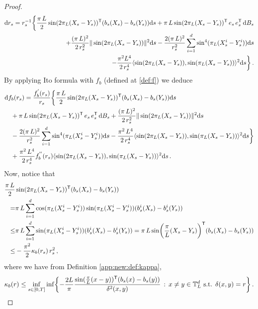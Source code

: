 \documentclass[final,12pt]{colt2023} %
\newcommand{\bes}{\begin{equation}}
\newcommand{\ees}{\end{equation}}
\newcommand{\De}{\mathrm{d}}
\begin{document}
\begin{proof}
\bes
\begin{split}
    \De r_s=r_s^{-1} \biggl\{\frac{{\pi \, L}}{2}\sin(2{\pi_L}(X_s-Y_s))^{{\sf  T}}(b_s(X_s)-b_s(Y_s))\De s+{\pi \, L}\sin(2{\pi_L}(X_s-Y_s))^{{\sf  T}}\,e_s\,e_s^{{\sf  T}}\,\De B_s\\
+\frac{(\pi \, L)^2}{2\,r_s^2}\|\sin(2{\pi_L}(X_s-Y_s))\|^2\De s- \frac{2(\pi \, L)^2}{r_s^2}\sum_{i=1}^d\sin^4({\pi_L}(X_s^i-Y_s^i))\De s\\
-\frac{\pi^2 L^4}{2\,r_s^{4}}\langle \sin(2{\pi_L}(X_s-Y_s)),\sin({\pi_L}(X_s-Y_s))\rangle^2\De s\biggr\}\,.
\end{split}
\ees
By applying Ito formula with $f_b$ (defined at \eqref{def:f}) we deduce 
\bes
\begin{split}
    & \De f_b(r_s) =\frac{f_b^{'}(r_s)}{r_s}\biggl\{
    \frac{{\pi \, L }}{2}\sin(2{\pi_L}(X_s-Y_s))^{{\sf  T}}(b_s(X_s)-b_s(Y_s))\De s \\
    & \quad +{\pi \, L}\sin(2{\pi_L}(X_s-Y_s))^{{\sf  T}}\,e_s\,e_s^{{\sf  T}}\,\De B_s 
    +\frac{(\pi \, L)^2}{2\,r_s^2}\|\sin(2{\pi_L}(X_s-Y_s))\|^2\De s \\
     & \quad- \frac{2(\pi \, L)^2}{r_s^2}\sum_{i=1}^d\sin^4({\pi_L}(X_s^i-Y_s^i))\De s
-\frac{\pi^2 \, L^4}{2\,r_s^{4}}\langle \sin(2{\pi_L}(X_s-Y_s)),\sin({\pi_L}(X_s-Y_s))\rangle^2\De s\biggr\}\\
     & \quad+\frac{\pi^2 \, L^4}{2\,r_s^4}f_b^{''}(r_s)\langle \sin(2{\pi_L}(X_s-Y_s)),\sin({\pi_L}(X_s-Y_s))\rangle^2\De s\,.
\end{split}
\ees
Now, notice that
\bes
\begin{split}
\frac{\pi \, L}{2}&\sin(2{\pi_L}(X_s-Y_s))^{{\sf  T}}(b_s(X_s)-b_s(Y_s))\\
=&\pi \, L \sum_{i=1}^d \cos({\pi_L}(X_s^i-Y_s^i))\sin({\pi_L}(X^i_s-Y^i_s))(b^i_s(X_s)-b^i_s(Y_s))\\
\leq& \pi \, L \sum_{i=1}^d \sin(\pi_L(X^i_s-Y^i_s))(b^i_s(X_s)-b^i_s(Y_s))= \pi \, L \sin\biggl(\frac{\pi}{L}(X_s-Y_s)\biggr)^{{\sf  T}}(b_s(X_s)-b_s(Y_s))\\
\leq& -\frac{{\pi^2}}{2} \kappa_b(r_s)\,r^2_s\,,
\end{split}
\ees
where we have from Definition \ref{app:new:def:kappa},
\[\kappa_b(r)\leq \inf_{s\in[0,T]}\inf\biggl\{-\frac{2L}{\pi}\frac{\sin(\frac{\pi}{L}(x-y))^{{\sf  T}}(b_s(x)-b_s(y))}{\delta^2(x,y)}\,:\,x\neq y\in\mathbb{T}_L^d\text{ s.t. }\delta(x,y)=r \biggr\}\,.\]


\end{proof}
\end{document}
